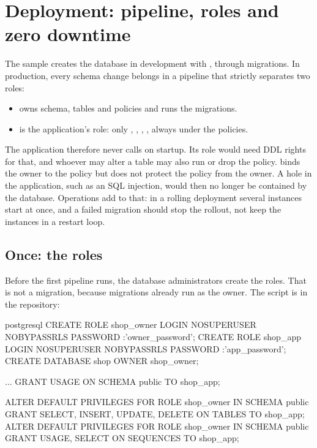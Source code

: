 \section{Deployment: pipeline, roles and zero downtime}\label{sec:deployment}

The  sample creates the database in development with
,  through migrations.
In production, every schema change belongs in a pipeline that strictly separates two roles:

\begin{itemize}
  \item \textbf{} owns schema, tables and policies and runs the
    migrations.
  \item \textbf{} is the application's role: only
    , , , , always under the policies.
\end{itemize}

The application therefore never calls
 on startup. Its role would
need DDL rights for that, and whoever may alter a table may also run
 or drop the policy.  binds the owner to the policy
but does not protect the policy from the owner. A hole in the application, such as an SQL
injection, would then no longer be contained by the database. Operations add to that: in a
rolling deployment several instances start at once, and a failed migration should stop the
rollout, not keep the instances in a restart loop.

\subsection*{Once: the roles}

Before the first pipeline runs, the database administrators create the roles. That is not a
migration, because migrations already run as the owner. The script is in the repository:

\begin{sourcecode}{postgresql}
CREATE ROLE shop_owner LOGIN NOSUPERUSER NOBYPASSRLS PASSWORD :'owner_password';
CREATE ROLE shop_app LOGIN NOSUPERUSER NOBYPASSRLS PASSWORD :'app_password';
CREATE DATABASE shop OWNER shop_owner;

...
GRANT USAGE ON SCHEMA public TO shop_app;

ALTER DEFAULT PRIVILEGES FOR ROLE shop_owner IN SCHEMA public
    GRANT SELECT, INSERT, UPDATE, DELETE ON TABLES TO shop_app;
ALTER DEFAULT PRIVILEGES FOR ROLE shop_owner IN SCHEMA public
    GRANT USAGE, SELECT ON SEQUENCES TO shop_app;
\end{sourcecode}

